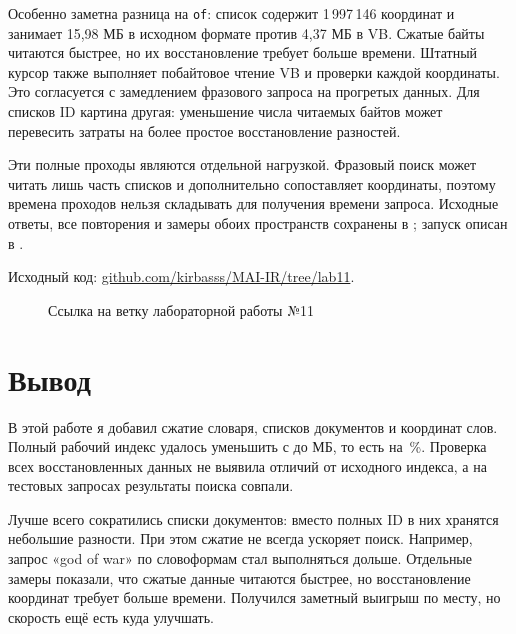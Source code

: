 \documentclass[12pt,a4paper]{article}
\begin{document}
Особенно заметна разница на \texttt{of}: список содержит 1\,997\,146 координат
и занимает 15{,}98 МБ в исходном формате против 4{,}37 МБ в VB.
Сжатые байты читаются быстрее, но их восстановление требует больше времени.
Штатный курсор также выполняет побайтовое чтение VB и проверки каждой
координаты. Это согласуется с замедлением фразового запроса на прогретых данных.
Для списков ID картина другая: уменьшение числа читаемых байтов может
перевесить затраты на более простое восстановление разностей.

Эти полные проходы являются отдельной нагрузкой. Фразовый поиск может читать
лишь часть списков и дополнительно сопоставляет координаты, поэтому времена
проходов нельзя складывать для получения времени запроса.
Исходные ответы, все повторения и замеры обоих пространств сохранены
в ; запуск описан в .

Исходный код:
\href{https://github.com/kirbasss/MAI-IR/tree/lab11}{github.com/kirbasss/MAI-IR/tree/lab11}.
\begin{figure}[H]
\centering
\begingroup
\hypersetup{urlcolor=black}
\endgroup
\caption{Ссылка на ветку лабораторной работы №11}
\end{figure}

\newpage
\section{Вывод}
В этой работе я добавил сжатие словаря, списков документов и координат слов.
Полный рабочий индекс удалось уменьшить с \LabElevenWholeRawMB{} до
\LabElevenPackedMB{} МБ, то есть на \LabElevenWholeSavings\,\%.
Проверка всех восстановленных данных не выявила отличий от исходного индекса,
а на тестовых запросах результаты поиска совпали.

Лучше всего сократились списки документов: вместо полных ID в них хранятся
небольшие разности. При этом сжатие не всегда ускоряет поиск.
Например, запрос «god of war» по словоформам стал выполняться дольше.
Отдельные замеры показали, что сжатые данные читаются быстрее,
но восстановление координат требует больше времени.
Получился заметный выигрыш по месту, но скорость ещё есть куда улучшать.
\end{document}
